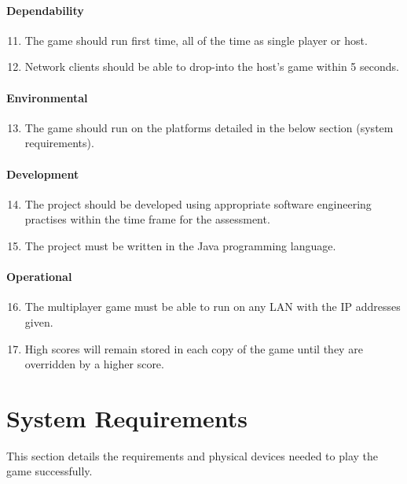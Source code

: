\paragraph{Dependability}
\begin{enumerate}
\setcounter{enumi}{10}
\item The game should run first time, all of the time as single player or host.
\item Network clients should be able to drop-into the host's game within 5 seconds.
\end{enumerate}

\paragraph{Environmental}
\begin{enumerate}
\setcounter{enumi}{12}
\item The game should run on the platforms detailed in the below section (system requirements).
\end{enumerate}

\paragraph{Development}
\begin{enumerate}
\setcounter{enumi}{13}
\item The project should be developed using appropriate software engineering practises within the time frame for the assessment.
\item The project must be written in the Java programming language.
\end{enumerate}

\paragraph{Operational}
\begin{enumerate}
\setcounter{enumi}{15}
\item The multiplayer game must be able to run on any LAN with the IP addresses given.
\item High scores will remain stored in each copy of the game until they are overridden by a higher score.
\end{enumerate}

\section{System Requirements}
\label {sec: system_requirements}
This section details the requirements and physical devices needed to play the game successfully.

